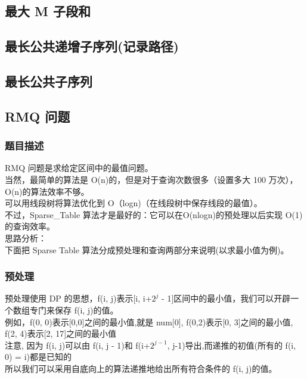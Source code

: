 \documentclass[a4paper]{article}
\begin{document}
\begin{CJK*}{UTF8}{gbsn}
\begin{multicols}{3}
\begin{flushleft}
\subsection{最大 M 子段和}


\subsection{最长公共递增子序列(记录路径)}


\subsection{最长公共子序列}


\subsection{RMQ 问题}

\subsubsection{题目描述}
RMQ 问题是求给定区间中的最值问题。\\
当然，最简单的算法是 O(n)的，但是对于查询次数很多（设置多大 100 万次），O(n)的算法效率不够。\\
可以用线段树将算法优化到 O（logn)（在线段树中保存线段的最值）。\\
不过，Sparse\_Table 算法才是最好的：它可以在O(nlogn)的预处理以后实现 O(1)的查询效率。\\
思路分析：\\
下面把 Sparse Table 算法分成预处理和查询两部分来说明(以求最小值为例)。\\


\subsubsection{预处理}
预处理使用 DP 的思想，f(i, j)表示[i, i+$2^j$ - 1]区间中的最小值，我们可以开辟一个数组专门来保存 f(i, j)的值。\\
例如，f(0, 0)表示[0,0]之间的最小值,就是 num[0], f(0,2)表示[0, 3]之间的最小值, f(2, 4)表示[2, 17]之间的最小值\\
注意, 因为 f(i, j)可以由 f(i, j - 1)和 f(i+$2^{j-1}$, j-1)导出,而递推的初值(所有的 f(i, 0) = i)都是已知的\\
所以我们可以采用自底向上的算法递推地给出所有符合条件的 f(i, j)的值。\\



\end{flushleft}
\end{multicols}
\end{CJK*}
\end{document}
